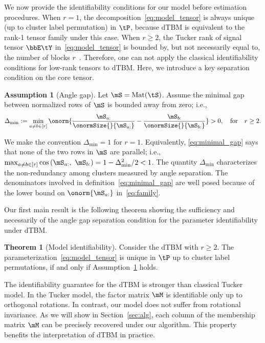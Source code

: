 \documentclass[lettersize,onecolumn,journal]{IEEEtran}
\theoremstyle{definition}
\newtheorem{thm}{Theorem}
\theoremstyle{definition}
\newtheorem{assumption}{Assumption}
\newcommand{\of}[1]{\left(#1\right)}
\begin{document}
We now provide the identifiability conditions for our model before estimation procedures. When $r=1$, the decomposition~\eqref{eq:model_tensor} is always unique (up to cluster label permutation) in $\tP$, because dTBM is equivalent to the rank-1 tensor family under this case. When $r\geq 2$, the Tucker rank of signal tensor $\bbE\tY$ in~\eqref{eq:model_tensor} is bounded by, but not necessarily equal to, the number of blocks $r$~\citep{wang2019multiway}. Therefore, one can not apply the classical identifiability conditions for low-rank tensors to dTBM. Here, we introduce a key separation condition on the core tensor. 

\begin{assumption}[Angle gap] \label{assmp:min_gap}Let $\mS = \text{Mat}(\tS)$. Assume the minimal gap between normalized rows of $\mS$ is bounded away from zero; i.e.,
\begin{equation}\label{eq:minimal_gap}
    \Delta_{\min} := \min_{a \neq b \in [r]} \onorm{\frac{\mS_{a:}}{\onormSize{}{ \mS_{a:}}} - \frac{\mS_{b:}}{\onormSize{}{ \mS_{b:}}} }>0, \quad \text{for} \quad r \geq 2.
\end{equation}
\end{assumption}
We make the convention $\Delta_{\min} = 1$ for $r = 1$. Equivalently, \eqref{eq:minimal_gap} says that none of the two rows in $\mS$ are parallel; i.e., $\max_{a \neq b\in [r]}\cos \of{\mS_{a:},\  \mS_{b:}}  = 1-\Delta^2_{\min}/2<1$. The quantity $\Delta_{\min}$ characterizes the non-redundancy among clusters measured by angle separation. The denominators involved in definition~\eqref{eq:minimal_gap} are well posed because of the lower bound on $\onorm{\mS_{a:}}$ in~\eqref{eq:family}. 

Our first main result is the following theorem showing the sufficiency and necessarily of the angle gap separation condition for the parameter identifiability under dTBM. 

\begin{thm}[Model identifiability]\label{thm:unique} Consider the dTBM with $r\geq 2$. The parameterization~\eqref{eq:model_tensor} is unique in $\tP$ up to cluster label permutations, if and only if Assumption~\ref{assmp:min_gap} holds.
\end{thm}

The identifiability guarantee for the dTBM is stronger than classical Tucker model. In the Tucker model, the factor matrix $\mM$ is identifiable only up to orthogonal rotations. In contrast, our model does not suffer from rotational invariance. As we will show in Section~\ref{sec:alg}, each column of the membership matrix $\mM$ can be precisely recovered under our algorithm. This property benefits the interpretation of dTBM in practice. 
\end{document}
